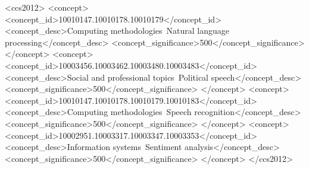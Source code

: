\documentclass[manuscript,screen,review]{acmart}
\begin{document}
\begin{abstract}
This report compares the rhetoric of Alcide De Gasperi and Giorgia Meloni. After building a corpus of public speeches transcribed with Whisper from Giorgia Meloni's videos on YouTube, I compare them with a corpus of speeches from the Italian Republic's first Prime Minister Alcide De Gasperi. The results show that De Gasperi's speeches are, on average, 30\% more diversified in their lexicon, and the corpora have a Jaccard similarity index of 32\%. The highest-frequency words in common show transversal themes, such as freedom, peace and nation, while the highest-frequency words not in common reflect the PMs' different political and societal landscapes. I also performed a sentiment analysis on each speech using a BERT classifier. The results underscore the importance of domain-appropriate training data: the model was trained on product reviews, not on political rhetoric, which translated to an average confidence of roughly 40\% per classification.
\end{abstract}
\begin{CCSXML}
<ccs2012>
   <concept>
       <concept_id>10010147.10010178.10010179</concept_id>
       <concept_desc>Computing methodologies~Natural language processing</concept_desc>
       <concept_significance>500</concept_significance>
       </concept>
   <concept>
       <concept_id>10003456.10003462.10003480.10003483</concept_id>
       <concept_desc>Social and professional topics~Political speech</concept_desc>
       <concept_significance>500</concept_significance>
       </concept>
   <concept>
       <concept_id>10010147.10010178.10010179.10010183</concept_id>
       <concept_desc>Computing methodologies~Speech recognition</concept_desc>
       <concept_significance>500</concept_significance>
       </concept>
   <concept>
       <concept_id>10002951.10003317.10003347.10003353</concept_id>
       <concept_desc>Information systems~Sentiment analysis</concept_desc>
       <concept_significance>500</concept_significance>
       </concept>
 </ccs2012>
\end{CCSXML}

\end{document}
